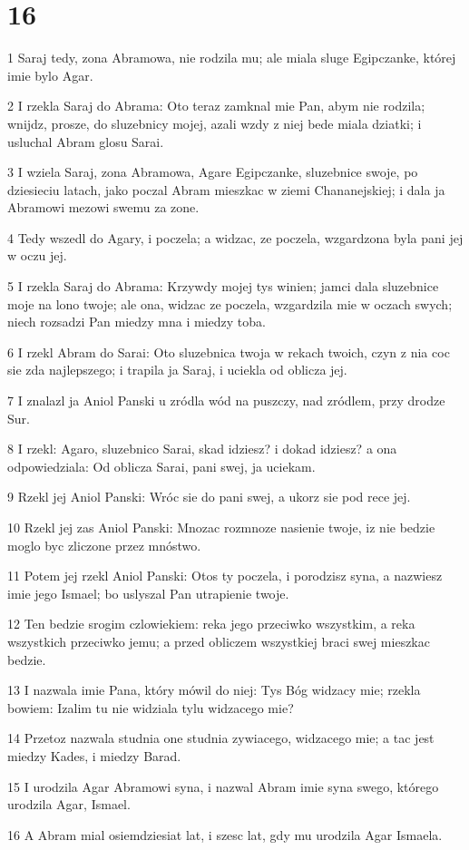 \chapter{16}

\par 1 Saraj tedy, zona Abramowa, nie rodzila mu; ale miala sluge Egipczanke, której imie bylo Agar.
\par 2 I rzekla Saraj do Abrama: Oto teraz zamknal mie Pan, abym nie rodzila; wnijdz, prosze, do sluzebnicy mojej, azali wzdy z niej bede miala dziatki; i usluchal Abram glosu Sarai.
\par 3 I wziela Saraj, zona Abramowa, Agare Egipczanke, sluzebnice swoje, po dziesieciu latach, jako poczal Abram mieszkac w ziemi Chananejskiej; i dala ja Abramowi mezowi swemu za zone.
\par 4 Tedy wszedl do Agary, i poczela; a widzac, ze poczela, wzgardzona byla pani jej w oczu jej.
\par 5 I rzekla Saraj do Abrama: Krzywdy mojej tys winien; jamci dala sluzebnice moje na lono twoje; ale ona, widzac ze poczela, wzgardzila mie w oczach swych; niech rozsadzi Pan miedzy mna i miedzy toba.
\par 6 I rzekl Abram do Sarai: Oto sluzebnica twoja w rekach twoich, czyn z nia coc sie zda najlepszego; i trapila ja Saraj, i uciekla od oblicza jej.
\par 7 I znalazl ja Aniol Panski u zródla wód na puszczy, nad zródlem, przy drodze Sur.
\par 8 I rzekl: Agaro, sluzebnico Sarai, skad idziesz? i dokad idziesz? a ona odpowiedziala: Od oblicza Sarai, pani swej, ja uciekam.
\par 9 Rzekl jej Aniol Panski: Wróc sie do pani swej, a ukorz sie pod rece jej.
\par 10 Rzekl jej zas Aniol Panski: Mnozac rozmnoze nasienie twoje, iz nie bedzie moglo byc zliczone przez mnóstwo.
\par 11 Potem jej rzekl Aniol Panski: Otos ty poczela, i porodzisz syna, a nazwiesz imie jego Ismael; bo uslyszal Pan utrapienie twoje.
\par 12 Ten bedzie srogim czlowiekiem: reka jego przeciwko wszystkim, a reka wszystkich przeciwko jemu; a przed obliczem wszystkiej braci swej mieszkac bedzie.
\par 13 I nazwala imie Pana, który mówil do niej: Tys Bóg widzacy mie; rzekla bowiem: Izalim tu nie widziala tylu widzacego mie?
\par 14 Przetoz nazwala studnia one studnia zywiacego, widzacego mie; a tac jest miedzy Kades, i miedzy Barad.
\par 15 I urodzila Agar Abramowi syna, i nazwal Abram imie syna swego, którego urodzila Agar, Ismael.
\par 16 A Abram mial osiemdziesiat lat, i szesc lat, gdy mu urodzila Agar Ismaela.


